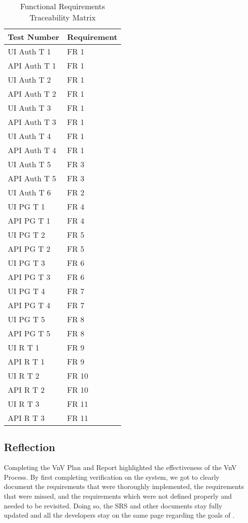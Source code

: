 \documentclass[12pt, titlepage]{article}
\begin{document}
\begin{table}[H]
	\caption{Functional Requirements Traceability Matrix} \label{TraceMatrix1}
	\begin{tabular}{ll}
		\toprule
		\textbf{Test Number} & \textbf{Requirement} \\
		\midrule
		UI Auth T 1 & FR 1\\
		API Auth T 1 & FR 1\\
		UI Auth T 2 & FR 1\\
		API Auth T 2 & FR 1\\
		UI Auth T 3 & FR 1\\
		API Auth T 3 & FR 1\\
		UI Auth T 4 & FR 1\\
		API Auth T 4 & FR 1\\
		UI Auth T 5 & FR 3\\
		API Auth T 5 & FR 3\\
		UI Auth T 6 & FR 2\\
		\midrule
		UI PG T 1 & FR 4\\
		API PG T 1 & FR 4\\
		UI PG T 2 & FR 5\\
		API PG T 2 & FR 5\\
		UI PG T 3 & FR 6\\
		API PG T 3 & FR 6\\
		UI PG T 4 & FR 7\\
		API PG T 4 & FR 7\\
		UI PG T 5 & FR 8\\
		API PG T 5 & FR 8\\
		\midrule
		UI R T 1 & FR 9\\
		API R T 1 & FR 9\\
		UI R T 2 & FR 10\\
		API R T 2 & FR 10\\
		UI R T 3 & FR 11\\
		API R T 3 & FR 11\\
		\bottomrule
	\end{tabular}
\end{table}

\subsection*{Reflection}
Completing the VnV Plan and Report highlighted the effectiveness of the VnV Process. By first completing verification on the system, we got to clearly document the requirements that were thoroughly implemented, the requirements that were missed, and the requirements which were not defined properly and needed to be revisited. Doing so, the SRS and other documents stay fully updated and all the developers stay on the same page regarding the goals of \progname . 
\end{document}
